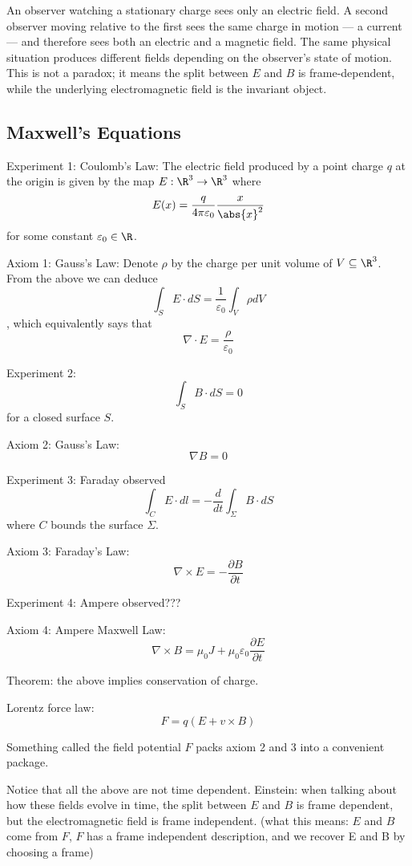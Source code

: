 \documentclass[a4paper]{article}
\begin{document}
An observer watching a stationary charge sees only an electric field. A second observer moving relative to the first sees the same charge in motion --- a current --- and therefore sees both an electric and a magnetic field. The same physical situation produces different fields depending on the observer's state of motion. This is not a paradox; it means the split between $E$ and $B$ is frame-dependent, while the underlying electromagnetic field is the invariant object. 

\subsection*{Maxwell's Equations}
Experiment 1: Coulomb's Law: The electric field produced by a point charge $q$ at the origin is given by the map $E:\R^3\to\R^3$ where $$E(x)=\frac{q}{4\pi\varepsilon_0}\frac{x}{\abs{x}^2}$$ for some constant $\varepsilon_0\in\R$. 

Axiom 1: Gauss's Law: Denote $\rho$ by the charge per unit volume of $V\subseteq\R^3$. From the above we can deduce $$\int_SE\cdot dS=\frac{1}{\varepsilon_0}\int_V\rho dV$$, which equivalently says that $$\nabla\cdot E=\frac{\rho}{\varepsilon_0}$$


Experiment 2: $$\int_SB\cdot dS=0$$ for a closed surface $S$. 

Axiom 2: Gauss's Law: $$\nabla B=0$$

Experiment 3: Faraday observed $$\int_CE\cdot dl=-\frac{d}{dt}\int_\Sigma B\cdot dS$$ where $C$ bounds the surface $\Sigma$. 

Axiom 3: Faraday's Law: $$\nabla\times E=-\frac{\partial B}{\partial t}$$

Experiment 4: Ampere observed???

Axiom 4: Ampere Maxwell Law: $$\nabla\times B=\mu_0J+\mu_0\varepsilon_0\frac{\partial E}{\partial t}$$

Theorem: the above implies conservation of charge. 

Lorentz force law: $$F=q(E+v\times B)$$

Something called the field potential $F$ packs axiom 2 and 3 into a convenient package. 

Notice that all the above are not time dependent. Einstein: when talking about how these fields evolve in time, the split between $E$ and $B$ is frame dependent, but the electromagnetic field is frame independent. (what this means: $E$ and $B$ come from $F$, $F$ has a frame independent description, and we recover E and B by choosing a frame)
\end{document}

